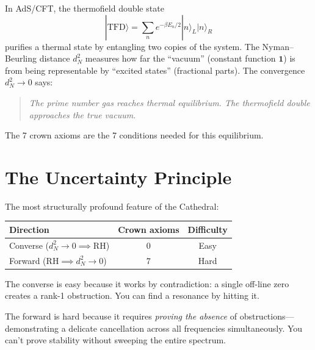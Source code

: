 \documentclass[11pt,a4paper]{article}
\theoremstyle{definition}
\newcommand{\RH}{\mathrm{RH}}
\begin{document}
In AdS/CFT, the thermofield double state
\[
  |\mathrm{TFD}\rangle = \sum_n e^{-\beta E_n / 2} |n\rangle_L |n\rangle_R
\]
purifies a thermal state by entangling two copies of the system.
The Nyman--Beurling distance $d_N^2$ measures how far the
``vacuum'' (constant function $\mathbf{1}$) is from being
representable by ``excited states'' (fractional parts).
The convergence $d_N^2 \to 0$ says:

\begin{quote}
\emph{The prime number gas reaches thermal equilibrium.
The thermofield double approaches the true vacuum.}
\end{quote}

The 7 crown axioms are the 7 conditions needed for this equilibrium.

\section{The Uncertainty Principle}
\label{sec:uncertainty}

The most structurally profound feature of the Cathedral:

\begin{center}
\begin{tabular}{@{}lcc@{}}
\toprule
\textbf{Direction} & \textbf{Crown axioms} & \textbf{Difficulty} \\
\midrule
Converse ($d_N^2 \to 0 \implies \RH$) & 0 & Easy \\
Forward ($\RH \implies d_N^2 \to 0$) & 7 & Hard \\
\bottomrule
\end{tabular}
\end{center}

The converse is easy because it works by contradiction: a single
off-line zero creates a rank-1 obstruction. You can find a resonance
by hitting it.

The forward is hard because it requires \emph{proving the absence}
of obstructions---demonstrating a delicate cancellation across all
frequencies simultaneously. You can't prove stability without
sweeping the entire spectrum.
\end{document}
